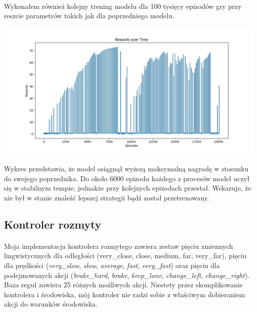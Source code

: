 \documentclass{article}
\begin{document}
\newpage

\paragraph{}
Wykonałem również kolejny trening modelu dla 100 tysięcy epizodów gry przy reszcie parametrów takich jak dla poprzedniego modelu.

\includegraphics[width=1\linewidth]{PPO.jpg}

\paragraph{}
Wykres przedstawia, że model osiągnął wyższą maksymalną nagrodę w stosunku do swojego poprzednika. Do około 6000 epizodu każdego z procesów model uczył się w stabilnym tempie, jednakże przy kolejnych epizodach przestał. Wskazuje, że nie był w stanie znaleźć lepszej strategii bądź został przetrenowany.

\newpage

\subsection{Kontroler rozmyty}
\paragraph{}
Moja implementacja kontrolera rozmytego zawiera zestaw pięciu zmiennych lingwistycznych dla odległości (very\_close, close, medium, far, very\_far), pięciu dla prędkości (\textit{very\_slow}, \textit{slow}, \textit{average}, \textit{fast}, \textit{very\_fast}) oraz pięciu dla podejmowanych akcji (\textit{brake\_hard}, \textit{brake}, \textit{keep\_lane}, \textit{change\_left}, \textit{change\_right}). Baza reguł zawiera 25 różnych możliwych akcji. Niestety przez skomplikowanie kontrolera i środowiska, mój kontroler nie radzi sobie z właściwym dobieraniem akcji do warunków środowiska.
\end{document}
